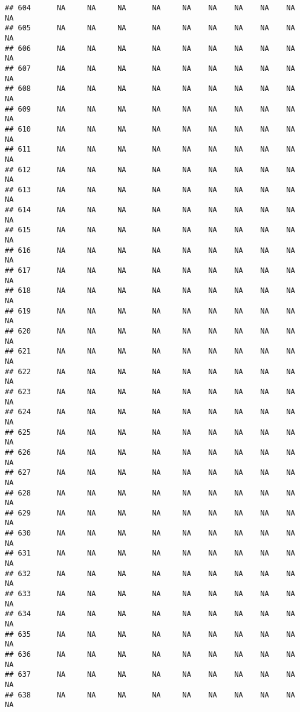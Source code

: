 \documentclass{article}\usepackage{graphicx, color}
\makeatletter
\newenvironment{kframe}{%
 \def\at@end@of@kframe{}%
 \ifinner\ifhmode%
  \def\at@end@of@kframe{\end{minipage}}%
  \begin{minipage}{\columnwidth}%
 \fi\fi%
 \def\FrameCommand##1{\hskip\@totalleftmargin \hskip-\fboxsep
 \colorbox{shadecolor}{##1}\hskip-\fboxsep
     \hskip-\linewidth \hskip-\@totalleftmargin \hskip\columnwidth}%
 \MakeFramed {\advance\hsize-\width
   \@totalleftmargin\z@ \linewidth\hsize
   \@setminipage}}%
 {\par\unskip\endMakeFramed%
 \at@end@of@kframe}
\newenvironment{knitrout}{}{} %
\makeatother
\begin{document}
\begin{knitrout}
\begin{kframe}
\begin{verbatim}
## 604      NA     NA     NA      NA     NA    NA    NA    NA    NA     NA
## 605      NA     NA     NA      NA     NA    NA    NA    NA    NA     NA
## 606      NA     NA     NA      NA     NA    NA    NA    NA    NA     NA
## 607      NA     NA     NA      NA     NA    NA    NA    NA    NA     NA
## 608      NA     NA     NA      NA     NA    NA    NA    NA    NA     NA
## 609      NA     NA     NA      NA     NA    NA    NA    NA    NA     NA
## 610      NA     NA     NA      NA     NA    NA    NA    NA    NA     NA
## 611      NA     NA     NA      NA     NA    NA    NA    NA    NA     NA
## 612      NA     NA     NA      NA     NA    NA    NA    NA    NA     NA
## 613      NA     NA     NA      NA     NA    NA    NA    NA    NA     NA
## 614      NA     NA     NA      NA     NA    NA    NA    NA    NA     NA
## 615      NA     NA     NA      NA     NA    NA    NA    NA    NA     NA
## 616      NA     NA     NA      NA     NA    NA    NA    NA    NA     NA
## 617      NA     NA     NA      NA     NA    NA    NA    NA    NA     NA
## 618      NA     NA     NA      NA     NA    NA    NA    NA    NA     NA
## 619      NA     NA     NA      NA     NA    NA    NA    NA    NA     NA
## 620      NA     NA     NA      NA     NA    NA    NA    NA    NA     NA
## 621      NA     NA     NA      NA     NA    NA    NA    NA    NA     NA
## 622      NA     NA     NA      NA     NA    NA    NA    NA    NA     NA
## 623      NA     NA     NA      NA     NA    NA    NA    NA    NA     NA
## 624      NA     NA     NA      NA     NA    NA    NA    NA    NA     NA
## 625      NA     NA     NA      NA     NA    NA    NA    NA    NA     NA
## 626      NA     NA     NA      NA     NA    NA    NA    NA    NA     NA
## 627      NA     NA     NA      NA     NA    NA    NA    NA    NA     NA
## 628      NA     NA     NA      NA     NA    NA    NA    NA    NA     NA
## 629      NA     NA     NA      NA     NA    NA    NA    NA    NA     NA
## 630      NA     NA     NA      NA     NA    NA    NA    NA    NA     NA
## 631      NA     NA     NA      NA     NA    NA    NA    NA    NA     NA
## 632      NA     NA     NA      NA     NA    NA    NA    NA    NA     NA
## 633      NA     NA     NA      NA     NA    NA    NA    NA    NA     NA
## 634      NA     NA     NA      NA     NA    NA    NA    NA    NA     NA
## 635      NA     NA     NA      NA     NA    NA    NA    NA    NA     NA
## 636      NA     NA     NA      NA     NA    NA    NA    NA    NA     NA
## 637      NA     NA     NA      NA     NA    NA    NA    NA    NA     NA
## 638      NA     NA     NA      NA     NA    NA    NA    NA    NA     NA

\end{verbatim}
\end{kframe}
\end{knitrout}
\end{document}
